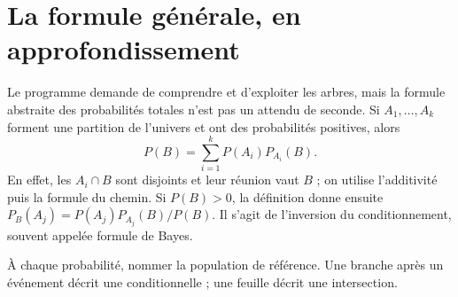 \documentclass[../cours_2de.tex]{subfiles}
\begin{document}
\section{La formule générale, en approfondissement}
Le programme demande de comprendre et d'exploiter les arbres, mais la formule abstraite des probabilités totales n'est pas un attendu de seconde.
\approfondissement Si $A_1,\ldots,A_k$ forment une partition de l'univers et ont des probabilités positives, alors
\[
P(B)=\sum_{i=1}^k P(A_i)P_{A_i}(B).
\]
En effet, les $A_i\cap B$ sont disjoints et leur réunion vaut $B$ ; on utilise l'additivité puis la formule du chemin.
Si $P(B)>0$, la définition donne ensuite
$P_B(A_j)=P(A_j)P_{A_j}(B)/P(B)$.
Il s'agit de l'inversion du conditionnement, souvent appelée formule de Bayes.
\begin{retenir}
À chaque probabilité, nommer la population de référence. Une branche après un événement décrit une conditionnelle ; une feuille décrit une intersection.
\end{retenir}
\end{document}
